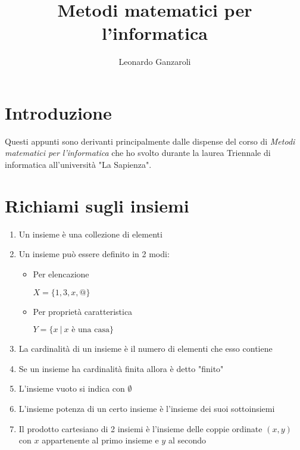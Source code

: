 \documentclass{article}
\title{Metodi matematici per l'informatica}
\author{Leonardo Ganzaroli}
\date{}
\begin{document}
\maketitle


\tableofcontents

\newpage

\hypersetup{allcolors=black}

\section*{Introduzione}

Questi appunti sono derivanti principalmente dalle dispense del corso di \textit{Metodi matematici per l'informatica} che ho svolto durante la laurea Triennale di informatica all'università "La Sapienza".

\newpage

\section{Richiami sugli insiemi}

\begin{enumerate}
    \item Un insieme è una collezione di elementi
    \item Un insieme può essere definito in 2 modi:
    \begin{itemize}
    
        \item Per elencazione

            \qquad $X=\{1,3,x,@\}$

        \item Per proprietà caratteristica

            \qquad $Y=\{x\ |\ x \text{ è una casa}\}$
        
    \end{itemize}

    \item La cardinalità di un insieme è il numero di elementi che esso contiene

    \item Se un insieme ha cardinalità finita allora è detto "finito"

    \item L'insieme vuoto si indica con $\emptyset$

    \item L'insieme potenza di un certo insieme è l'insieme dei suoi sottoinsiemi

    \item Il prodotto cartesiano di 2 insiemi è l'insieme delle coppie ordinate $(x,y)$ con $x$ appartenente al primo insieme e $y$ al secondo

\vspace{10pt}
    
\end{enumerate}
\end{document}
